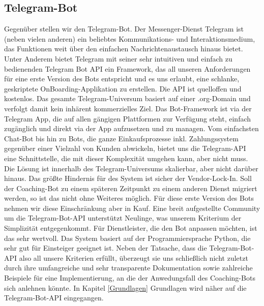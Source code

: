     \subsection{Telegram-Bot}
        Gegenüber stellen wir den Telegram-Bot. Der Messenger-Dienst Telegram ist (neben vielen anderen) ein beliebtes Kommunikations- und Interaktionsmedium, das Funktionen weit über den einfachen Nachrichtenaustausch hinaus bietet. Unter Anderem bietet Telegram mit seiner sehr intuitiven und einfach zu bedienenden Telegram Bot API ein Framework, das all unseren Anforderungen für eine erste Version des Bots entspricht und es uns erlaubt, eine schlanke, geskriptete OnBoarding-Applikation zu erstellen. Die API ist quelloffen und kostenlos. Das gesamte Telegram-Universum basiert auf einer .org-Domain und verfolgt damit kein inhärent kommerzielles Ziel. Das Bot-Framework ist via der Telegram App, die auf allen gängigen Plattformen zur Verfügung steht, einfach zugänglich und direkt via der App aufzusetzen und zu managen. Vom einfachsten Chat-Bot bis hin zu Bots, die ganze Einkaufsprozesse inkl. Zahlungssystem gegenüber einer Vielzahl von Kunden abwickeln, bietet uns die Telegram-API eine Schnittstelle, die mit dieser Komplexität umgehen kann, aber nicht muss. Die Lösung ist innerhalb des Telegram-Universums skalierbar, aber nicht darüber hinaus. Das größte Hindernis für des System ist sicher der Vendor-Lock-In. Soll der Coaching-Bot zu einem späteren Zeitpunkt zu einem anderen Dienst migriert werden, so ist das nicht ohne Weiteres möglich. Für diese erste Version des Bots nehmen wir diese Einschränkung aber in Kauf. Eine breit aufgestellte Community um die Telegram-Bot-API unterstützt Neulinge, was unserem Kriterium der Simplizität entgegenkommt. Für Dienstleister, die den Bot anpassen möchten, ist das sehr wertvoll. Das System basiert auf der Programmiersprache Python, die sehr gut für Einsteiger geeignet ist. Neben der Tatsache, dass die Telegram-Bot-API also all unsere Kriterien erfüllt, überzeugt sie uns schließlich nicht zuletzt durch ihre umfangreiche und sehr transparente Dokumentation sowie zahlreiche Beispiele für eine Implementierung, an die der Anwedungsfall des Coaching-Bots sich anlehnen könnte. In Kapitel \ref*{Grundlagen} Grundlagen wird näher auf die Telegram-Bot-API eingegangen.

        
         
    